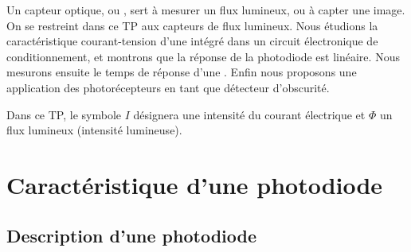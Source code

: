 





Un capteur optique, ou , sert à mesurer un flux lumineux, ou à capter une image. On se restreint dans ce TP aux capteurs de flux lumineux.
Nous étudions la caractéristique courant-tension d’une  intégré dans un circuit électronique de conditionnement, et montrons que la réponse de la photodiode est linéaire. Nous mesurons ensuite le temps de réponse d'une . Enfin nous proposons une application des photorécepteurs en tant que détecteur d’obscurité.
\begin{danger}
    Dans ce TP, le symbole $I$ désignera une intensité du courant électrique et $\Phi$ un flux lumineux (intensité lumineuse).
\end{danger}

\section{Caractéristique d'une photodiode}

\subsection{Description d’une photodiode}

